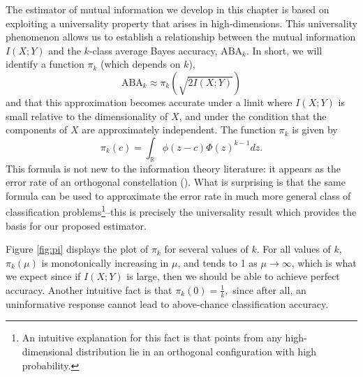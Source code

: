 The estimator of mutual information we develop in this chapter is
based on exploiting a universality property that arises in
high-dimensions.  This universality phenomenon allows us to establish
a relationship between the mutual information $I(X; Y)$ and the
$k$-class average Bayes accuracy, $\text{ABA}_k$.  In short, we will
identify a function $\pi_k$ (which depends on $k$),
\begin{equation}\label{abepi}
\text{ABA}_k \approx \pi_k(\sqrt{2 I(X; Y)})
\end{equation}
and that this approximation becomes accurate under a limit where $I(X;
Y)$ is small relative to the dimensionality of $X$, and under the
condition that the components of $X$ are approximately independent.
The function $\pi_k$ is given by
\[
\pi_k(c) = \int_{\mathbb{R}} \phi(z - c)  \Phi(z)^{k-1} dz.
\]
This formula is not new to the information theory literature: it
appears as the error rate of an orthogonal constellation (\cite{cioffi2014}).  What
is surprising is that the same formula can be used to approximate the
error rate in much more general class of classification
problems\footnote{An intuitive explanation for this fact is that
  points from any high-dimensional distribution lie in an orthogonal
  configuration with high probability.}--this is precisely the
universality result which provides the basis for our proposed
estimator.

Figure \ref{fig:pi} displays the plot of $\pi_k$ for several values of
$k$.  For all values of $k$, $\pi_k(\mu)$ is monotonically increasing
in $\mu$, and tends to 1 as $\mu \to \infty$, which is what we expect
since if $I(X; Y)$ is large, then we should be able to achieve perfect
accuracy.  Another intuitive fact is that $ \pi_k(0) = \frac{1}{k}, $
since after all, an uninformative response cannot lead to above-chance
classification accuracy.


